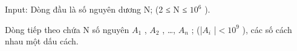 Input:
Dòng đầu là số nguyên dương N; (2 ≤ N ≤ $10^{6}$ ).

Dòng tiếp theo chứa N số nguyên $A_{1}$ , $A_{2}$ , …, $A_{n}$ ; (|$A_{i}$ |$<$$10^{9}$ ), các số cách nhau một dấu cách.